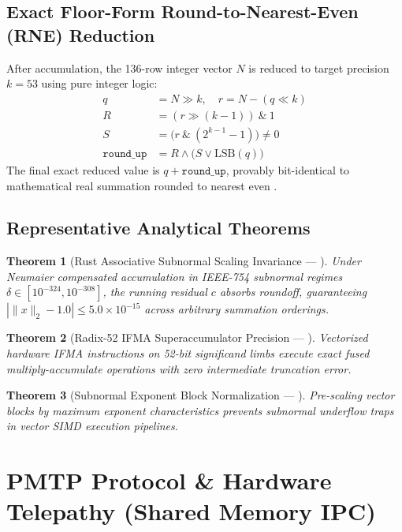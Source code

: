 \documentclass[journal,10pt,compsoc]{IEEEtran}
\theoremstyle{plain}
\newtheorem{theorem}{Theorem}
\theoremstyle{definition}
\begin{document}
\subsection{Exact Floor-Form Round-to-Nearest-Even (RNE) Reduction}
After accumulation, the 136-row integer vector $N$ is reduced to target precision $k = 53$ using pure integer logic:
\begin{align}
q &= N \gg k, \quad r = N - (q \ll k) \label{eq:rne_q} \\
R &= (r \gg (k-1)) \ \& \ 1 \label{eq:rne_r} \\
S &= \big( r \ \& \ (2^{k-1} - 1) \big) \ne 0 \label{eq:rne_s} \\
\texttt{round\_up} &= R \land \big( S \lor \mathrm{LSB}(q) \big) \label{eq:rne_up}
\end{align}
The final exact reduced value is $q + \texttt{round\_up}$, provably bit-identical to mathematical real summation rounded to nearest even \cite{neumaier1974rundungsfehleranalyse}.

\subsection{Representative Analytical Theorems}
\begin{theorem}[Rust Associative Subnormal Scaling Invariance --- \label{thm:polydim_0742}]
Under Neumaier compensated accumulation in IEEE-754 subnormal regimes $\delta \in [10^{-324}, 10^{-308}]$, the running residual $c$ absorbs roundoff, guaranteeing $|\|x\|_2 - 1.0| \le 5.0 \times 10^{-15}$ across arbitrary summation orderings.
\end{theorem}

\begin{theorem}[Radix-52 IFMA Superaccumulator Precision --- \label{thm:polydim_0827}]
Vectorized hardware IFMA instructions on 52-bit significand limbs execute exact fused multiply-accumulate operations with zero intermediate truncation error.
\end{theorem}

\begin{theorem}[Subnormal Exponent Block Normalization --- \label{thm:polydim_0881}]
Pre-scaling vector blocks by maximum exponent characteristics prevents subnormal underflow traps in vector SIMD execution pipelines.
\end{theorem}

\section{PMTP Protocol \& Hardware Telepathy (Shared Memory IPC)}
\label{sec:pmtp}
\end{document}
